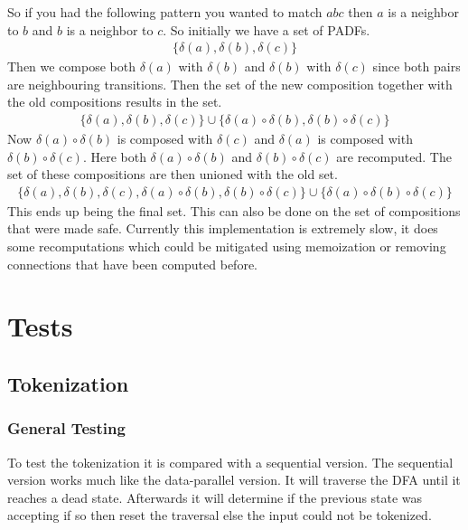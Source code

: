 \documentclass[a4paper,12pt]{article}
\theoremstyle{definition}
\begin{document}
So if you had the following pattern you wanted to match $abc$ then $a$ is a neighbor to $b$ and $b$ is a neighbor to $c$. So initially we have a set of PADFs.
\begin{align*}
  \{\delta(a), \delta(b), \delta(c)\}
\end{align*}
Then we compose both $\delta(a)$ with $\delta(b)$ and $\delta(b)$ with $\delta(c)$ since both pairs are neighbouring transitions. Then the set of the new composition together with the old compositions results in the set.
\begin{align*}
  \{\delta(a), \delta(b), \delta(c)\} \cup \{\delta(a) \circ \delta(b), \delta(b) \circ \delta(c)\}
\end{align*}
Now $\delta(a) \circ \delta(b)$ is composed with $\delta(c)$ and $\delta(a)$ is composed with $\delta(b) \circ \delta(c)$. Here both $\delta(a) \circ \delta(b)$ and $\delta(b) \circ \delta(c)$ are recomputed. The set of these compositions are then unioned with the old set.
\begin{align*}
  \{\delta(a), \delta(b), \delta(c), \delta(a) \circ \delta(b), \delta(b) \circ \delta(c)\} \cup \{\delta(a) \circ \delta(b) \circ \delta(c)\}
\end{align*}
This ends up being the final set. This can also be done on the set of compositions that were made safe. Currently this implementation is extremely slow, it does some recomputations which could be mitigated using memoization or removing connections that have been computed before.

\section{Tests}
\subsection{Tokenization}
\subsubsection{General Testing}
To test the tokenization it is compared with a sequential version. The sequential version works much like the data-parallel version. It will traverse the DFA until it reaches a dead state. Afterwards it will determine if the previous state was accepting if so then reset the traversal else the input could not be tokenized.
\end{document}

